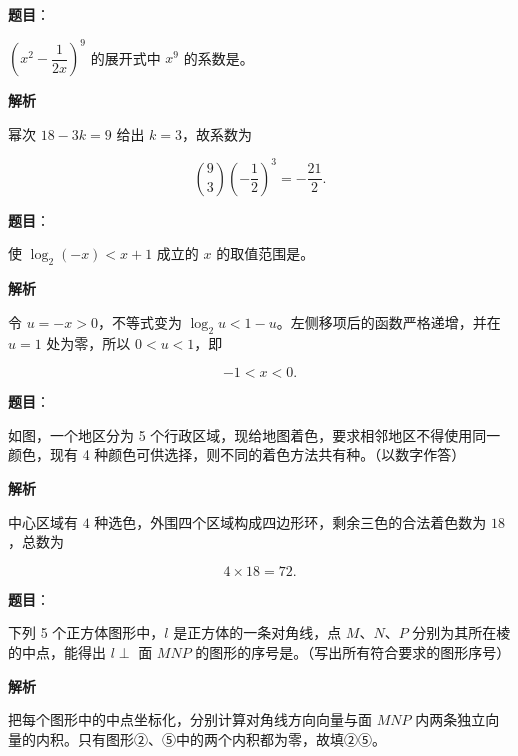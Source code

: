 \begin{answer}

\textbf{题目}：

$\left(x^2-\dfrac1{2x}\right)^9$ 的展开式中 $x^9$ 的系数是\gkblank{}。

\textbf{解析}

幂次 $18-3k=9$ 给出 $k=3$，故系数为

\nopagebreak[4]
\[
\binom93\left(-\frac12\right)^3=-\frac{21}{2}.
\]


\end{answer}
\begin{answer}

\textbf{题目}：

使 $\log_2(-x)<x+1$ 成立的 $x$ 的取值范围是\gkblank{}。

\textbf{解析}

令 $u=-x>0$，不等式变为 $\log_2u<1-u$。左侧移项后的函数严格递增，并在 $u=1$ 处为零，所以 $0<u<1$，即

\nopagebreak[4]
\[
-1<x<0.
\]


\end{answer}
\begin{answer}

\textbf{题目}：

如图，一个地区分为 5 个行政区域，现给地图着色，要求相邻地区不得使用同一颜色，现有 4 种颜色可供选择，则不同的着色方法共有\gkblank{}种。（以数字作答）
\nopagebreak[4]
\begin{center}\end{center}
\nopagebreak[4]
\textbf{解析}

中心区域有 $4$ 种选色，外围四个区域构成四边形环，剩余三色的合法着色数为 $18$，总数为

\nopagebreak[4]
\[
4\times18=72.
\]


\end{answer}
\begin{answer}

\textbf{题目}：

下列 5 个正方体图形中，$l$ 是正方体的一条对角线，点 $M\text{、}N\text{、}P$ 分别为其所在棱的中点，能得出 $l\perp$ 面 $MNP$ 的图形的序号是\gkblank{}。（写出所有符合要求的图形序号）
\nopagebreak[4]
\begin{center}\end{center}
\nopagebreak[4]
\textbf{解析}

把每个图形中的中点坐标化，分别计算对角线方向向量与面 $MNP$ 内两条独立向量的内积。只有图形②、⑤中的两个内积都为零，故填②⑤。


\end{answer}

